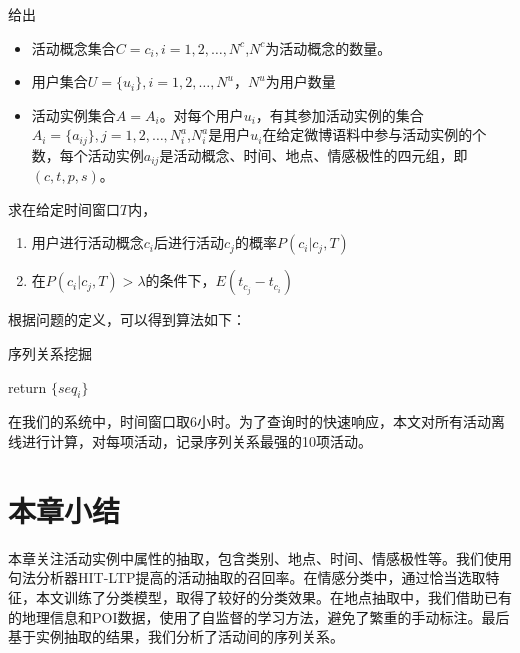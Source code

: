 \begin{problem}[序列关系挖掘]
给出
\begin{itemize}
\item 活动概念集合$C={c_i},i=1,2,\ldots,N^c$,$N^c$为活动概念的数量。
\item 用户集合$U=\{u_i\},i=1,2,\ldots,N^u$，$N^u$为用户数量
\item 活动实例集合$A = {A_i}$。对每个用户$u_i$，有其参加活动实例的集合$A_i = \{a_{ij}\}, j=1,2,\ldots,N_i^a$,$N_i^a$是用户$u_i$在给定微博语料中参与活动实例的个数，每个活动实例$a_{ij}$是活动概念、时间、地点、情感极性的四元组，即$(c,t,p,s)$。
\end{itemize}
求在给定时间窗口$T$内，
\begin{enumerate}
\item 用户进行活动概念$c_i$后进行活动$c_j$的概率$P(c_i|c_j,T)$
\item 在$P(c_i|c_j,T)>\lambda$的条件下，$E(t_{c_j} - t_{c_i})$
\end{enumerate}
\end{problem}

根据问题的定义，可以得到算法如下：

\begin{algorithm}
  \caption{序列关系挖掘}

  return $\{seq_i\}$
\end{algorithm}

在我们的系统中，时间窗口取6小时。为了查询时的快速响应，本文对所有活动离线进行计算，对每项活动，记录序列关系最强的10项活动。

\section{本章小结}
本章关注活动实例中属性的抽取，包含类别、地点、时间、情感极性等。我们使用句法分析器HIT-LTP提高的活动抽取的召回率。在情感分类中，通过恰当选取特征，本文训练了分类模型，取得了较好的分类效果。在地点抽取中，我们借助已有的地理信息和POI数据，使用了自监督的学习方法，避免了繁重的手动标注。最后基于实例抽取的结果，我们分析了活动间的序列关系。


